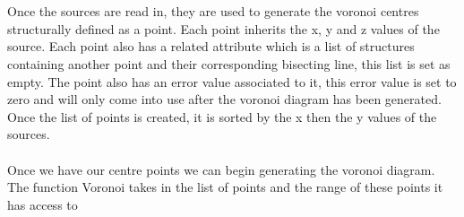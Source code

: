 \\
\\
Once the sources are read in, they are used to generate the voronoi centres structurally defined as a point. Each point inherits the x, y and z values of the source. Each point also has a related attribute which is a list of structures containing another point and their corresponding bisecting line, this list is set as empty. The point also has an error value associated to it, this error value is set to zero and will only come into use after the voronoi diagram has been generated. Once the list of points is created, it is sorted by the x then the y values of the sources.
\\
\\
Once we have our centre points we can begin generating the voronoi diagram. The function Voronoi takes in the list of points and the range of these points it has access to